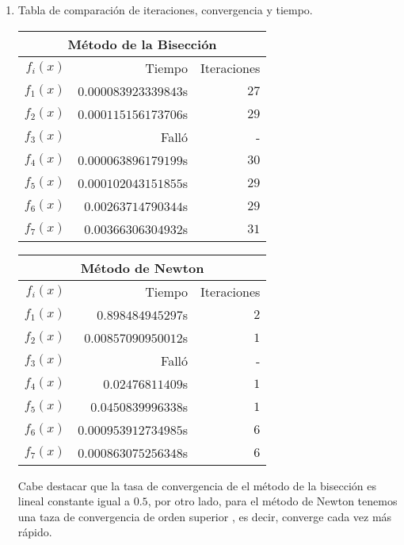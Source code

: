 \documentclass[spanish, fleqn]{article}
\begin{document}
\begin{enumerate}
		\item
			Tabla de comparación de iteraciones, convergencia y tiempo.
			\begin{center}
				\begin{tabular}{|r|r|r|}
					\hline
					\multicolumn{3}{|c|}{\textbf{Método de la Bisección}}\\
					\hline
					$f_i(x)$ & Tiempo & Iteraciones\\
					\hline
					$f_1(x)$ & $0.000083923339843$s	&	$27$	\\
					\hline
					$f_2(x)$ & $0.000115156173706$s	&	$29$	\\
					\hline
					$f_3(x)$ & Falló &	-	\\
					\hline
					$f_4(x)$ & $0.000063896179199$s &	$30$	\\
					\hline
					$f_5(x)$ & $0.000102043151855$s &	$29$	\\
					\hline
					$f_6(x)$ & $0.00263714790344$s &	$29$	\\
					\hline
					$f_7(x)$ & $0.00366306304932$s &	$31$	\\
					\hline
				\end{tabular}
				\qquad
				\begin{tabular}{|r|r|r|}
					\hline
					\multicolumn{3}{|c|}{\textbf{Método de Newton}}\\
					\hline
					$f_i(x)$ & Tiempo & Iteraciones \\
					\hline
					$f_1(x)$ & $0.898484945297$s &	$2$ \\
					\hline
					$f_2(x)$ & $0.00857090950012$s &	$1$ \\
					\hline
					$f_3(x)$ & Falló &	-	\\
					\hline
					$f_4(x)$ & $0.02476811409$s &	$1$	\\
					\hline
					$f_5(x)$ & $0.0450839996338$s &	$1$	\\
					\hline
					$f_6(x)$ & $0.000953912734985$s &	$6$	\\
					\hline
					$f_7(x)$ & $0.000863075256348$s &	$6$	\\
					\hline
				\end{tabular}
			\end{center}
			Cabe destacar que la tasa de convergencia de el método de la 
			bisección es lineal constante igual a $0.5$, por otro lado, para el
			método de Newton tenemos una taza de convergencia de orden superior
			, es decir, converge cada vez más rápido.
	\end{enumerate}
\end{document}
